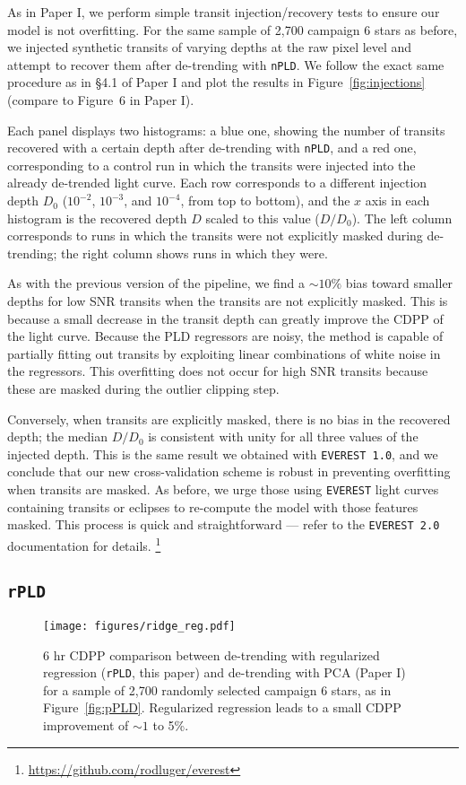 \documentclass[]{emulateapj}
\begin{document}
As in Paper I, we perform simple transit injection/recovery tests to ensure
our model is not overfitting. For the same sample of 2,700 campaign 6 stars
as before, we injected synthetic transits of varying depths at the raw pixel level
and attempt to recover them after de-trending with \texttt{nPLD}. We follow
the exact same procedure as in \S4.1 of Paper I and plot the results in
Figure~\ref{fig:injections} (compare to Figure~6 in Paper I).

Each panel displays two histograms: a blue one, showing the number of
transits recovered with a certain depth after de-trending with \texttt{nPLD}, 
and a red one, corresponding to a control run in which the transits were injected
into the already de-trended light curve. Each row corresponds to a different
injection depth $D_0$ ($10^{-2}$, $10^{-3}$, and $10^{-4}$, from top to bottom), and the $x$ axis
in each histogram is the recovered depth $D$ scaled to this value ($D/D_0$). The 
left column corresponds to runs in which the transits were not explicitly masked
during de-trending; the right column shows runs in which they were.

As with the previous version of the pipeline, we find a ${\sim}10\%$ bias toward
smaller depths for low SNR transits when the transits are not explicitly masked. This
is because a small decrease in the transit depth can greatly improve the CDPP
of the light curve. Because the PLD regressors are noisy, the method is capable
of partially fitting out transits by exploiting linear combinations of white noise
in the regressors. This overfitting does not occur for high SNR transits because these
are masked during the outlier clipping step.

Conversely, when transits are explicitly masked, there is no bias in the recovered
depth; the median $D/D_0$ is consistent with unity for all three values of the injected 
depth. This is the same result we obtained with \texttt{EVEREST 1.0}, and we conclude
that our new cross-validation scheme is robust in preventing overfitting when transits
are masked. As before, we urge those using \texttt{EVEREST} light curves containing
transits or eclipses to re-compute the model with those features masked. This process
is quick and straightforward --- refer to the \texttt{EVEREST 2.0} documentation for
details.
\footnote{\url{https://github.com/rodluger/everest}}

\subsection{\texttt{rPLD}}
\begin{figure}[hbt]
  \begin{center}
      \texttt{[image: figures/ridge\_reg.pdf]}
       \caption{6 hr CDPP comparison between de-trending with regularized regression (\texttt{rPLD}, this paper) and
                de-trending with PCA (Paper I) for a sample of 2,700 randomly selected campaign 6
                stars, as in Figure~\ref{fig:pPLD}. Regularized regression leads to a small CDPP improvement of 
                ${\sim}1$ to 5\%.}
     \label{fig:rPLD}
  \end{center}
\end{figure}
\end{document}

